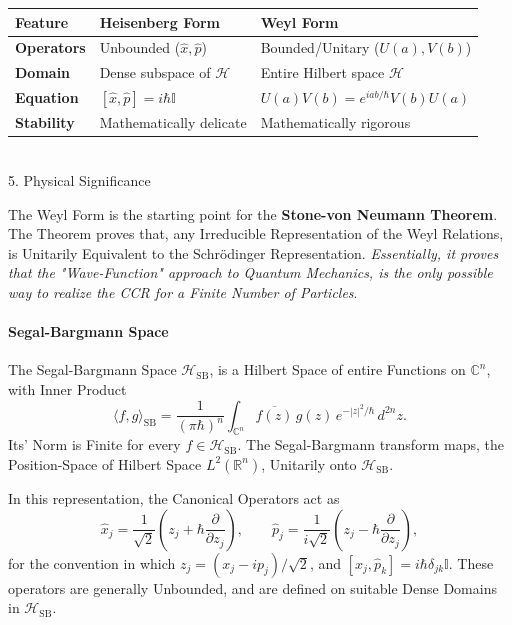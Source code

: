 \documentclass[a4paper, 10pt, onepage]{elegantbook}
\begin{document}
{\begin{tabular}{|l|l|l|}
\hline
\textbf{Feature} & \textbf{Heisenberg Form} & \textbf{Weyl Form} \\
\hline
\textbf{Operators} & Unbounded ($\hat{x}, \hat{p}$) & Bounded/Unitary ($U(a), V(b)$) \\
\hline
\textbf{Domain} & Dense subspace of $\mathcal{H}$ & Entire Hilbert space $\mathcal{H}$ \\
\hline
\textbf{Equation} & $[\hat{x}, \hat{p}] = i\hbar \mathbb{I}$ & $U(a)V(b) = e^{iab/\hbar} V(b)U(a)$ \\
\hline
\textbf{Stability} & Mathematically delicate & Mathematically rigorous \\
\hline
\end{tabular} \\

   5. Physical Significance  

The Weyl Form is the starting point for the \textbf{Stone-von Neumann Theorem}. The Theorem proves that, any 
Irreducible Representation of the Weyl Relations, is Unitarily Equivalent to the Schr\"odinger Representation. 
\emph{Essentially, it proves that the "Wave-Function" approach to Quantum Mechanics, is the only possible way to 
realize the CCR for a Finite Number of Particles}.

\paragraph{Segal-Bargmann Space}

The Segal-Bargmann Space $\mathcal{H}_{\mathrm{SB}}$, is a Hilbert Space of entire Functions on $\mathbb{C}^n$, with 
Inner Product
\[
\langle f,g\rangle_{\mathrm{SB}}
=
\frac{1}{(\pi\hbar)^n}
\int_{\mathbb{C}^n}
\overline{f(z)}\,g(z)\,
e^{-|z|^2/\hbar}\,d^{2n}z.
\]
Its' Norm is Finite for every $f\in\mathcal{H}_{\mathrm{SB}}$. The Segal-Bargmann transform maps, the Position-Space of 
Hilbert Space $L^2(\mathbb{R}^n)$, Unitarily onto $\mathcal{H}_{\mathrm{SB}}$.  

In this representation, the Canonical Operators act as  
\[
\hat{x}_j
=
\frac{1}{\sqrt{2}}\left(z_j+\hbar\frac{\partial}{\partial z_j}\right),
\qquad
\hat{p}_j
=
\frac{1}{i\sqrt{2}}\left(z_j-\hbar\frac{\partial}{\partial z_j}\right),
\]
for the convention in which $z_j=(x_j-ip_j)/\sqrt{2}$, and $[\hat{x}_j,\hat{p}_k]=i\hbar\delta_{jk}\mathbb{I}$. These 
operators are generally Unbounded, and are defined on suitable Dense Domains in $\mathcal{H}_{\mathrm{SB}}$.

}
\end{document}
